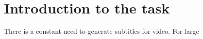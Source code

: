 \chapter{Introduction to the task}

There is a constant need to generate subtitles for video. For large 